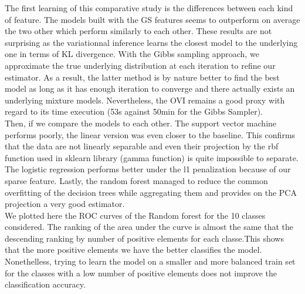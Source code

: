 \documentclass[twoside]{article}
\begin{document}
\begin{multicols}{2}
The first learning of this comparative study is the differences between each kind of feature. The models built with the GS features seems to outperform on average the two other which perform similarly to each other. These results are not surprising as the variationnal inference learns the closest model to the underlying one in terms of KL divergence. With the Gibbs sampling approach, we approximate the true underlying distribution at each iteration to refine our estimator. As a result, the latter method is by nature better to find the best model as long as it has enough iteration to converge and there actually exists an underlying mixture models. Nevertheless, the OVI remains a good proxy with regard to its time execution (53s against 50min for the Gibbs Sampler).\\

Then, if we compare the models to each other. The support vector machine performs poorly, the linear version was even closer to the baseline. This confirms that the data are not linearly separable and even their projection by the rbf function used in sklearn library (gamma function) is quite impossible to separate. The logistic regression performs better under the l1 penalization because of our sparse feature. Lastly, the random forest managed to reduce the common overfitting of the decision trees while aggregating them and provides on the PCA projection a very good estimator.\\

We plotted here the ROC curves of the Random forest for the 10 classes considered. The ranking of the area under the curve is almost the same that the descending ranking by number of positive elements for each classe.This shows that the more positive elements we have the better classifies the model. Nonethelless, trying to learn the model on a smaller and more balanced train set for the classes with a low number of positive elements does not improve the classification accuracy.


\end{multicols}
\end{document}
